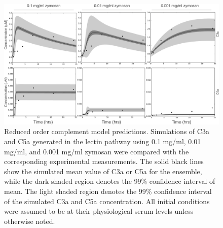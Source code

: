\documentclass[12pt]{article}
\begin{document}
\begin{figure}[h]
\centering
\includegraphics[width=1.0\textwidth]{./figs/Figure3_predictions_final_v3.pdf}
\caption{Reduced order complement model predictions.
Simulations of C3a and C5a generated in the lectin pathway using 0.1 mg/ml, 0.01 mg/ml, and 0.001 mg/ml zymosan were compared with the corresponding experimental measurements.
The solid black lines show the simulated mean value of C3a or C5a for the ensemble, while the dark shaded region denotes the 99\% confidence interval of mean.
The light shaded region denotes the 99\% confidence interval of the simulated C3a and C5a concentration.
All initial conditions were assumed to be at their physiological serum levels unless otherwise noted.
}\label{fig-prediction}
\end{figure}

\end{document}
